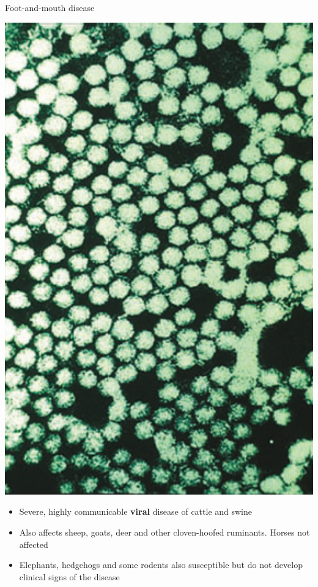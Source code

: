 \documentclass[aspectratio=43]{beamer}
\begin{document}
\begin{frame}{Foot-and-mouth disease}
  \begin{minipage}{0.3\textwidth}
    \includegraphics[width=1.1\textwidth]{../FIGS/Electronmicrograph_of_the_foot-and-mouth_disease_virus.png}
  \end{minipage}
  \begin{minipage}{0.65\textwidth}
    \begin{itemize}
      \item Severe, highly communicable \textbf{viral} disease of cattle and swine
      \item Also affects sheep, goats, deer and other cloven-hoofed ruminants. Horses not affected
      \item Elephants, hedgehogs and some rodents also susceptible but do not develop clinical signs of the disease
    \end{itemize}      
  \end{minipage}
\end{frame}
\end{document}

